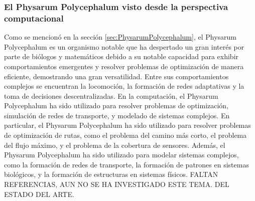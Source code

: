 \subsubsection{El Physarum Polycephalum visto desde la perspectiva computacional}
    Como se mencion\'o en la secci\'on \ref{sec:PhysarumPolycephalum}, el Physarum Polycephalum es un organismo notable 
        que ha despertado un gran inter\'es por parte de bi\'ologos y matem\'aticos debido a su notable capacidad para exhibir comportamientos 
        emergentes y resolver problemas de optimizaci\'on de manera eficiente, demostrando una gran versatilidad. Entre sus comportamientos 
        complejos se encuentran la locomoci\'on, la formaci\'on de redes adaptativas y la toma de decisiones descentralizadas.
    \vskip 0.5cm
    En la computaci\'on, el Physarum Polycephalum ha sido utilizado para resolver problemas de optimizaci\'on, 
        simulaci\'on de redes de transporte, y modelado de sistemas complejos. En particular, el Physarum Polycephalum
        ha sido utilizado para resolver problemas de optimizaci\'on de rutas, como el problema del camino m\'as corto,
        el problema del flujo m\'aximo, y el problema de la cobertura de sensores. Adem\'as, el Physarum Polycephalum
        ha sido utilizado para modelar sistemas complejos, como la formaci\'on de redes de transporte, la formaci\'on
        de patrones en sistemas biol\'ogicos, y la formaci\'on de estructuras en sistemas f\'isicos.
    \vskip 0.5cm
    FALTAN REFERENCIAS, AUN NO SE HA INVESTIGADO ESTE TEMA. DEL ESTADO DEL ARTE.
